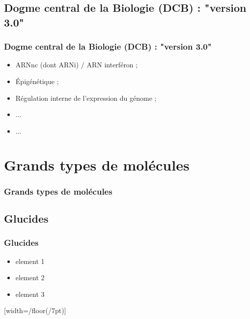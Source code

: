 \documentclass{beamer}
\begin{document}
\subsection{Dogme central de la Biologie (DCB) : "version 3.0"}
\begin{frame}
	\frametitle{Dogme central de la Biologie (DCB) : "version 3.0"}
	\begin{itemize}
		\item ARNnc (dont ARNi) / ARN interf{\'e}ron ; 
		\item {\'E}pig{\'e}n{\'e}tique ; 
		\item R{\'e}gulation interne de l'expression du g{\'e}nome ; 
		\item ... 
		\item ... 
	\end{itemize}
\end{frame}


\section{Grands types de mol{\'e}cules}
\begin{frame}
	\frametitle{Grands types de mol{\'e}cules}
	\tableofcontents[sections=3,currentsection,subsectionstyle=show/shaded/hide]
\end{frame} 

\subsection{ Glucides }
\begin{frame}
	\frametitle{ Glucides }
	\begin{itemize}
		\item element 1
		\item element 2
		\item element 3
	\end{itemize}
\end{frame}

{
  [width=\pgfdecoratedpathlength/floor(\pgfdecoratedpathlength/7pt)]
  {
    \pgfpathmoveto{\pgfpoint{-1pt}{0pt}}
    \pgfpathlineto{\pgfpoint{-1pt}{-10pt}}
    \pgfpathmoveto{\pgfpoint{1pt}{0pt}}
    \pgfpathlineto{\pgfpoint{1pt}{-10pt}}
    \pgfpathmoveto{\pgfpoint{1pt}{0pt}}
    \pgfpathcircle{\pgfpoint{0pt}{2pt}}{2.5pt}
  }
  {
    \pgfpathmoveto{\pgfpointdecoratedpathlast}
  }
}
\end{document}
